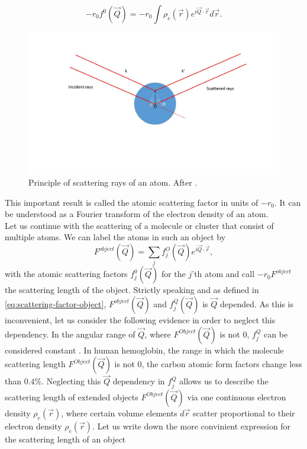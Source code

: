 \begin{equation}
-r_{0} f^{0}\left(\vec{Q}\right)=-r_{0}\int\rho_{e}\left(\vec{r}\right)e^{i \vec{Q}\cdot \vec{r}}d\vec{r}.
\label{eq:scattering-integral}
\end{equation}
\begin{figure}
	\centering
		\includegraphics[width=1.00\textwidth]{images/X-ray-scattering.jpg}
	\caption[Principle of scattering rays of an atom.]{Principle of scattering rays of an atom. After \cite{Als-Nielson-2011-JWS,Guinier-1955-JWS}.}
	\label{fig:X-ray-scattering}
\end{figure}
This important result is called the atomic scattering factor in units of $-r_{0}$. It can be understood as a Fourier transform of the electron density of an atom.\\
Let us continue with the scattering of a molecule or cluster that consist of multiple atoms. We can label the atoms in such an object by
\begin{equation}
F^{object}\left(\vec{Q}\right)=\sum_{j}f_{j}^{O}\left(\vec{Q}\right)e^{i \vec{Q}\cdot \vec{r}},
\label{eq:scattering-factor-object}
\end{equation}
with the atomic scattering factors $f_{j}^{0}\left(\vec{Q}\right)$ for the $j$'th atom and call $-r_{0} F^{object}$ the scattering length of the object. Strictly speaking and as defined in \eqref{eq:scattering-factor-object}, $F^{object}\left(\vec{Q}\right)$ and $f_{j}^{Q}\left(\vec{Q}\right)$ is $\vec{Q}$ depended. As this is inconvenient, let us consider the following evidence in order to neglect this dependency. In the angular range of $\vec{Q}$, where $F^{Object}\left(\vec{Q}\right)$ is not 0, $f_{j}^{Q}$ can be considered constant \citep[see][p. 6-7]{Guinier-1955-JWS}. In human hemoglobin, the range in which the molecule scattering length $F^{Object}\left(\vec{Q}\right)$ is not 0, the carbon atomic form factors change less than $0.4$\%. Neglecting this $\vec{Q}$ dependency in $f_{j}^{Q}$ allows us to describe the scattering length of extended objects $F^{Object}\left(\vec{Q}\right)$ via one continuous electron density $\rho_{e}\left(\vec{r}\right)$, where certain volume elements $d\vec{r}$ scatter proportional to their electron density $\rho_{e}\left(\vec{r}\right)$. Let us write down the more convinient expression for the scattering length of an object

